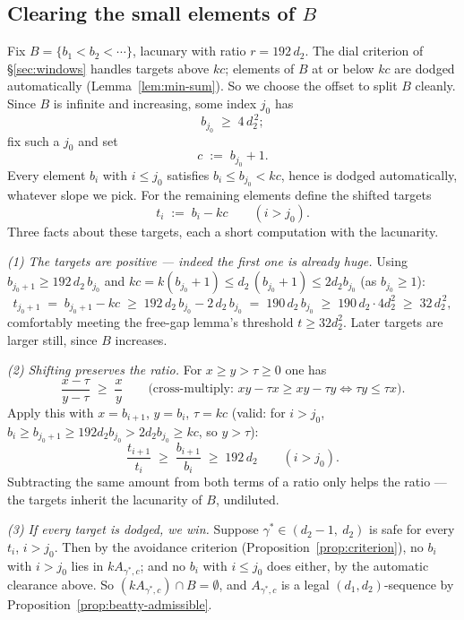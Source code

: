 \documentclass[11pt,reqno]{amsart}
\theoremstyle{plain}
\theoremstyle{definition}
\theoremstyle{remark}
\begin{document}
\subsection{Clearing the small elements of \texorpdfstring{$B$}{B}}\label{sec:small-b}

Fix $B = \{b_1 < b_2 < \cdots\}$, lacunary with ratio $r = 192\,d_2$. The dial
criterion of \S\ref{sec:windows} handles targets above $kc$; elements of $B$ at or
below $kc$ are dodged automatically (Lemma~\ref{lem:min-sum}). So we choose the
offset to split $B$ cleanly. Since $B$ is infinite and increasing, some index $j_0$
has
\[
  b_{j_0} \;\ge\; 4\,d_2^{\,2} ;
\]
fix such a $j_0$ and set
\[
  c \;:=\; b_{j_0} + 1 .
\]
Every element $b_i$ with $i \le j_0$ satisfies $b_i \le b_{j_0} < kc$, hence is
dodged automatically, whatever slope we pick. For the remaining elements define the
shifted targets
\[
  t_i \;:=\; b_i - kc \qquad (i > j_0) .
\]
Three facts about these targets, each a short computation with the lacunarity.

\emph{(1) The targets are positive --- indeed the first one is already huge.} Using
$b_{j_0+1} \ge 192\, d_2\, b_{j_0}$ and $kc = k(b_{j_0}+1) \le d_2\,(b_{j_0}+1) \le
2 d_2 b_{j_0}$ (as $b_{j_0} \ge 1$):
\[
  t_{j_0+1} \;=\; b_{j_0+1} - kc \;\ge\; 192\,d_2\,b_{j_0} - 2\,d_2\,b_{j_0}
  \;=\; 190\,d_2\,b_{j_0} \;\ge\; 190\,d_2 \cdot 4 d_2^2 \;\ge\; 32\,d_2^{\,2} ,
\]
comfortably meeting the free-gap lemma's threshold $t \ge 32 d_2^2$. Later targets
are larger still, since $B$ increases.

\emph{(2) Shifting preserves the ratio.} For $x \ge y > \tau \ge 0$ one has
\[
  \frac{x - \tau}{y - \tau} \;\ge\; \frac{x}{y}
  \qquad\text{(cross-multiply: } xy - \tau x \ge xy - \tau y \iff \tau y \le \tau x\text{)} .
\]
Apply this with $x = b_{i+1}$, $y = b_i$, $\tau = kc$ (valid: for $i > j_0$,
$b_i \ge b_{j_0+1} \ge 192 d_2 b_{j_0} > 2 d_2 b_{j_0} \ge kc$, so $y > \tau$):
\begin{equation}\label{eq:target-ratio}
  \frac{t_{i+1}}{t_i} \;\ge\; \frac{b_{i+1}}{b_i} \;\ge\; 192\, d_2
  \qquad (i > j_0) .
\end{equation}
Subtracting the same amount from both terms of a ratio only helps the ratio --- the
targets inherit the lacunarity of $B$, undiluted.

\emph{(3) If every target is dodged, we win.} Suppose $\gamma^* \in (d_2 - 1,\ d_2)$
is safe for every $t_i$, $i > j_0$. Then by the avoidance criterion
(Proposition~\ref{prop:criterion}), no $b_i$ with $i > j_0$ lies in
$kA_{\gamma^*,c}$; and no $b_i$ with $i \le j_0$ does either, by the automatic
clearance above. So $(kA_{\gamma^*,c}) \cap B = \emptyset$, and $A_{\gamma^*,c}$ is a
legal $(d_1,d_2)$-sequence by Proposition~\ref{prop:beatty-admissible}.
\end{document}
